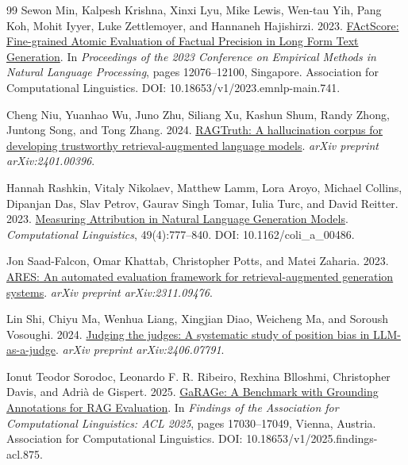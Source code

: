 \begin{thebibliography}{99}
Sewon Min, Kalpesh Krishna, Xinxi Lyu, Mike Lewis, Wen-tau Yih, Pang Koh, Mohit Iyyer, Luke Zettlemoyer, and Hannaneh Hajishirzi. 2023.
\newblock \href{https://aclanthology.org/2023.emnlp-main.741/}{FActScore: Fine-grained Atomic Evaluation of Factual Precision in Long Form Text Generation}.
\newblock In \emph{Proceedings of the 2023 Conference on Empirical Methods in Natural Language Processing}, pages 12076--12100, Singapore. Association for Computational Linguistics. DOI: 10.18653/v1/2023.emnlp-main.741.

Cheng Niu, Yuanhao Wu, Juno Zhu, Siliang Xu, Kashun Shum, Randy Zhong, Juntong Song, and Tong Zhang. 2024.
\newblock \href{https://arxiv.org/abs/2401.00396}{RAGTruth: A hallucination corpus for developing trustworthy retrieval-augmented language models}.
\newblock \emph{arXiv preprint arXiv:2401.00396}.

Hannah Rashkin, Vitaly Nikolaev, Matthew Lamm, Lora Aroyo, Michael Collins, Dipanjan Das, Slav Petrov, Gaurav Singh Tomar, Iulia Turc, and David Reitter. 2023.
\newblock \href{https://aclanthology.org/2023.cl-4.2/}{Measuring Attribution in Natural Language Generation Models}.
\newblock \emph{Computational Linguistics}, 49(4):777--840. DOI: 10.1162/coli\_a\_00486.

Jon Saad-Falcon, Omar Khattab, Christopher Potts, and Matei Zaharia. 2023.
\newblock \href{https://arxiv.org/abs/2311.09476}{ARES: An automated evaluation framework for retrieval-augmented generation systems}.
\newblock \emph{arXiv preprint arXiv:2311.09476}.

Lin Shi, Chiyu Ma, Wenhua Liang, Xingjian Diao, Weicheng Ma, and Soroush Vosoughi. 2024.
\newblock \href{https://arxiv.org/abs/2406.07791}{Judging the judges: A systematic study of position bias in LLM-as-a-judge}.
\newblock \emph{arXiv preprint arXiv:2406.07791}.

Ionut Teodor Sorodoc, Leonardo F. R. Ribeiro, Rexhina Blloshmi, Christopher Davis, and Adri{\`a} de Gispert. 2025.
\newblock \href{https://aclanthology.org/2025.findings-acl.875/}{GaRAGe: A Benchmark with Grounding Annotations for RAG Evaluation}.
\newblock In \emph{Findings of the Association for Computational Linguistics: ACL 2025}, pages 17030--17049, Vienna, Austria. Association for Computational Linguistics. DOI: 10.18653/v1/2025.findings-acl.875.


\end{thebibliography}
